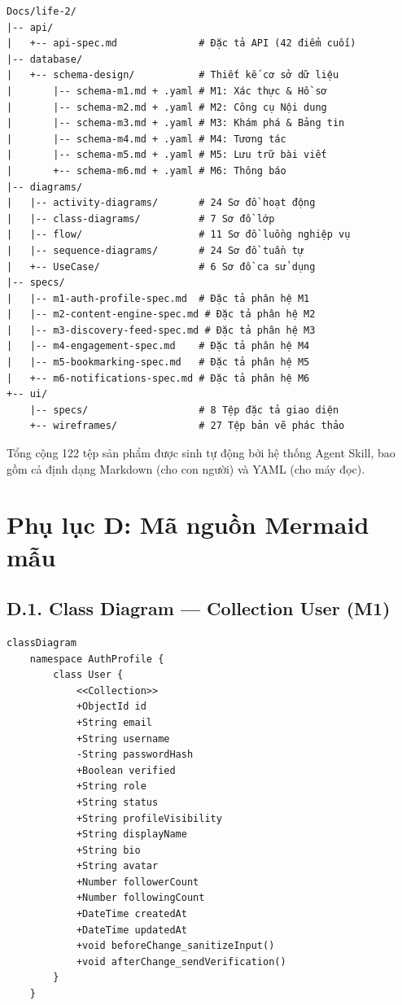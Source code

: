\documentclass[13pt,a4paper,oneside]{extreport}
\numberwithin{equation}{chapter}
\numberwithin{figure}{chapter}
\numberwithin{table}{chapter}
\begin{document}
\begin{verbatim}
Docs/life-2/
|-- api/
|   +-- api-spec.md              # Đặc tả API (42 điểm cuối)
|-- database/
|   +-- schema-design/           # Thiết kế cơ sở dữ liệu
|       |-- schema-m1.md + .yaml # M1: Xác thực & Hồ sơ
|       |-- schema-m2.md + .yaml # M2: Công cụ Nội dung
|       |-- schema-m3.md + .yaml # M3: Khám phá & Bảng tin
|       |-- schema-m4.md + .yaml # M4: Tương tác
|       |-- schema-m5.md + .yaml # M5: Lưu trữ bài viết
|       +-- schema-m6.md + .yaml # M6: Thông báo
|-- diagrams/
|   |-- activity-diagrams/       # 24 Sơ đồ hoạt động
|   |-- class-diagrams/          # 7 Sơ đồ lớp
|   |-- flow/                    # 11 Sơ đồ luồng nghiệp vụ
|   |-- sequence-diagrams/       # 24 Sơ đồ tuần tự
|   +-- UseCase/                 # 6 Sơ đồ ca sử dụng
|-- specs/
|   |-- m1-auth-profile-spec.md  # Đặc tả phân hệ M1
|   |-- m2-content-engine-spec.md # Đặc tả phân hệ M2
|   |-- m3-discovery-feed-spec.md # Đặc tả phân hệ M3
|   |-- m4-engagement-spec.md    # Đặc tả phân hệ M4
|   |-- m5-bookmarking-spec.md   # Đặc tả phân hệ M5
|   +-- m6-notifications-spec.md # Đặc tả phân hệ M6
+-- ui/
    |-- specs/                   # 8 Tệp đặc tả giao diện
    +-- wireframes/              # 27 Tệp bản vẽ phác thảo
\end{verbatim}

Tổng cộng 122 tệp sản phẩm được sinh tự động bởi hệ thống Agent Skill, bao gồm cả định dạng Markdown (cho con người) và YAML (cho máy đọc).

\section*{Phụ lục D: Mã nguồn Mermaid mẫu}

\subsection*{D.1. Class Diagram — Collection User (M1)}

\begin{verbatim}
classDiagram
    namespace AuthProfile {
        class User {
            <<Collection>>
            +ObjectId id
            +String email
            +String username
            -String passwordHash
            +Boolean verified
            +String role
            +String status
            +String profileVisibility
            +String displayName
            +String bio
            +String avatar
            +Number followerCount
            +Number followingCount
            +DateTime createdAt
            +DateTime updatedAt
            +void beforeChange_sanitizeInput()
            +void afterChange_sendVerification()
        }
    }
\end{verbatim}
\end{document}
